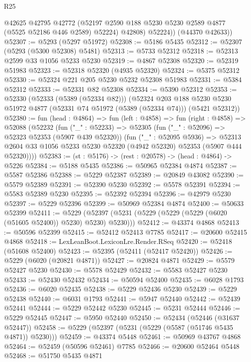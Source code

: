 \begin{lexlean}{R25}
\begin{coremodule}
            @42625
            @42795
            @42772
            (@52197 @2590 @188 @5230 @5230 @2589 @4877 (@5525 @52186 @446 @2589) @52224)
            @42808)
          @52224))
      (@44370 @42633))
@52307 := @5293 (@5297 @51972)
@52308 := @5186 @5435
@52312 := @52307 (@5293 (@5300 @52308) @5481)
@52313 := @5733 @52312
@52318 := @52313 @2599 @33 @1056 @5233 @5230
@52319 := @4867 @52308
@52320 := @52319 @51983
@52323 := @52318 @52320 (@4935 @52320)
@52324 := @5375 @52312
@52330 := @52324 @221 @205 @5230 @5232 @52308 @51983
@52331 := @5384 @52312
@52333 := @52331 @82 @52308
@52334 := @5390 @52312
@52353 := @52330
    (@52333 (@5389 (@52334 @82)))
    (@52324
      @203
      @188
      @5230
      @5230
      @51972
      @4877
      (@52331 @74 @51972 (@5389 (@52334 @74)))
      (@5421 @52312))
@52380 := fun (head : @4864) =>
  fun (left : @4858) =>
  fun (right : @4858) =>
  @52088
    (@52232
      (fun ("_" : @52233) =>
      @52305
        (fun ("_" : @52096) => @52323 @52353 (@5907 @439 @52320))
        (fun ("_" : @52095 @5936) =>
        @52313 @2604 @33 @1056 @5233 @5230 @52320 (@4942 @52320) @52353 (@5907 @444 @52320))))
@52383 := (st : @5176) -> (rest : @20578) -> (head : @4864) -> @5226
@52384 := @5188 @5435
@52386 := @50965 @52384 @4874
@52387 := @5587 @52386
@52388 := @5229 @52387
@52389 := @20849 @43082
@52390 := @5579 @52389
@52391 := @52390 @5230
@52392 := @5578 @52391
@52394 := @5583 @52389 @5230
@52395 := @52392 @52394
@52396 := @42979 @5230
@52397 := @5229 @52396
@52399 := @50969 @52384 @4874
@52400 := @50633 @52399
@52411 := @5229 (@52397 (@5231 (@5229 (@5229 (@5229 (@6020 (@51605 @52400)) @5230) @5230) @5230)))
@52412 := @43374 @4868
@52413 := @50596 @52399
@52415 := @52412 @52413 @7785
@52417 := @20600 @52415 @4868
@52418 := LexLeanBoot.LexiconLre.Render.RSeq
@52420 := @52418 (@51608 @52400)
@52423 := @52395 (@52411 (@52417 @52420))
@52426 := @5229 (@6020 (@20821 @4871))
@52427 := @20824 @4871
@52429 := @5579 @52427 @5230
@52430 := @5578 @52429
@52432 := @5583 @52427 @5230
@52433 := @52430 @52432
@52434 := @50594 @52400
@52435 := @6028 @1793
@52436 := @6020 @52435
@52438 := @5229 @52436 @5230
@52439 := @5229 @52438
@52440 := @6031 @1793
@52441 := @5947 @52440
@52442 := @52439 @52441
@52444 := @5229 @52442 @5230
@52445 := @5231 @52444
@52446 := @5229 @52445
@52447 := @5950 @52440
@52450 := @52434 (@52446 (@31637 @52447))
@52458 := @5229 (@52397 (@5231 (@5229 (@5587 (@51746 @5435 @4871)) @5230)))
@52459 := @43374 @5448
@52461 := @50969 @43767 @4868
@52464 := @52459 (@50596 @52461) @7785
@52466 := @20600 @52464 @5448
@52468 := @51750 @5435 @4871

\end{coremodule}
\end{lexlean}

